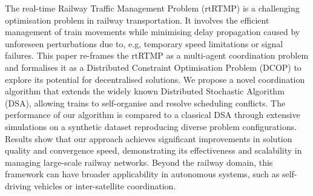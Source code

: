 The real-time Railway Traffic Management Problem (rtRTMP) is a challenging optimisation problem in railway transportation. It involves the efficient management of train movements while minimising delay propagation caused by unforeseen perturbations due to, e.g,  temporary speed limitations or signal failures. This paper re-frames the rtRTMP as a multi-agent coordination problem and formalises it as a Distributed Constraint Optimisation Problem (DCOP) to explore its potential for decentralised solutions. We propose a novel coordination algorithm that extends the widely known Distributed Stochastic Algorithm (DSA), allowing trains to self-organise and resolve scheduling conflicts. The performance of our algorithm is compared to a classical DSA through extensive simulations on a synthetic dataset reproducing diverse problem configurations. Results show that our approach achieves significant improvements in solution quality and convergence speed, demonstrating its effectiveness and scalability in managing large-scale railway networks. Beyond the railway domain, this framework can have broader applicability in autonomous systems, such as self-driving vehicles or inter-satellite coordination.